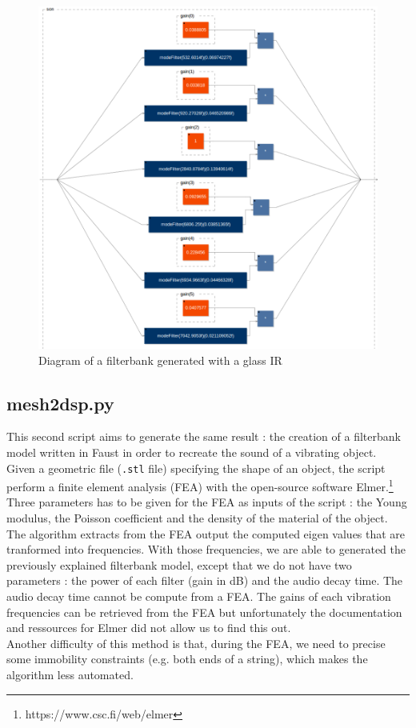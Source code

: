 \documentclass[11pt,a4paper]{article}
\begin{document}
\begin{figure}[h]
	\centering
	\includegraphics[scale=0.2]{pictures/filterbankdiagram.png}
	\caption{Diagram of a filterbank generated with a glass IR}
	\label{fig:filterbank}
\end{figure}

\subsection*{mesh2dsp.py}

This second script aims to generate the same result : the creation of a filterbank model written in Faust in order to recreate the sound of a vibrating object.\\
Given a geometric file (\texttt{.stl} file) specifying the shape of an object, the script perform a finite element analysis (FEA) with the open-source software Elmer.\footnote{https://www.csc.fi/web/elmer} Three parameters has to be given for the FEA as inputs of the script : the Young modulus, the Poisson coefficient and the density of the material of the object.\\
The algorithm extracts from the FEA output the computed eigen values that are tranformed into frequencies. With those frequencies, we are able to generated the previously explained filterbank model, except that we do not have two parameters : the power of each filter (gain in dB) and the audio decay time. The audio decay time cannot be compute from a FEA. The gains of each vibration frequencies can be retrieved from the FEA but unfortunately the documentation and ressources for Elmer did not allow us to find this out.\\
Another difficulty of this method is that, during the FEA, we need to precise some immobility constraints (e.g. both ends of a string), which makes the algorithm less automated.
\end{document}
